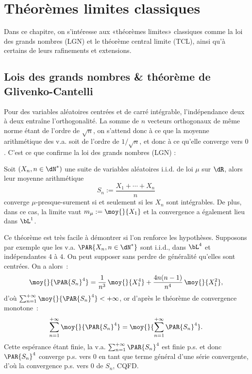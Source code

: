 %
%
\chapter{Théorèmes limites classiques}
%
%

Dans ce chapitre, on s'intéresse aux «théorèmes limites» classiques comme la
loi des grands nombres (LGN) et le théorème central limite (TCL), ainsi qu'à
certains de leurs rafinements et extensions.

%
\section{Lois des grands nombres \& théorème de Glivenko-Cantelli}\label{se:lgn}
%

Pour des variables aléatoires centrées et de carré intégrable, l'indépendance
deux à deux entraîne l'orthogonalité. La somme de $n$ vecteurs orthogonaux de
même norme étant de l'ordre de $\sqrt{n}$, on s'attend donc à ce que la
moyenne arithmétique des v.a. soit de l'ordre de $1/\sqrt{n}$, et donc à ce
qu'elle converge vers $0$. C'est ce que confirme la loi des grands nombres
(LGN) :

\begin{thm}
  Soit $(X_n,n\in\dN^*)$ une suite de variables aléatoires i.i.d. de loi $\mu$ sur
  $\dR$, alors leur moyenne arithmétique 
  $$
  S_n:=\frac{X_1+\cdots+X_n}{n}
  $$
  converge $\mu$-presque-surement si et seulement si les $X_n$ sont
  intégrables. De plus, dans ce cas, la limite vaut $m_\mu:=\moy{}{X_1}$ et la
  convergence a également lieu dans $\bL^1$.
\end{thm}

Ce théorème est très facile à démontrer si l'on renforce les hypothèses.
Supposons par exemple que les v.a. $\PAR{X_n,n\in\dN^*}$ sont i.i.d., dans
$\bL^4$ et indépendantes $4$ à $4$. On peut supposer sans perdre de généralité
qu'elles sont centrées. On a alors~:
$$
\moy{}{\PAR{S_n}^4}=\frac{1}{n^3}\,\moy{}{X_1^4}+\frac{4n(n-1)}{n^4}\,\moy{}{X_1^2},
$$
d'où $\sum_{n=1}^{+\infty}\moy{}{\PAR{S_n}^4}<+\infty$, or d'après le théorème
de convergence monotone~:
$$
\sum_{n=1}^{+\infty}\moy{}{\PAR{S_n}^4}
=\moy{}{\sum_{n=1}^{+\infty}\PAR{S_n}^4}.
$$
Cette espérance étant finie, la v.a. $\sum_{n=1}^{+\infty}\PAR{S_n}^4$ est
finie p.s. et donc $\PAR{S_n}^4$ converge p.s. vers $0$ en tant que terme
général d'une série convergente, d'où la convergence p.s. vers $0$ de $S_n$,
CQFD.

